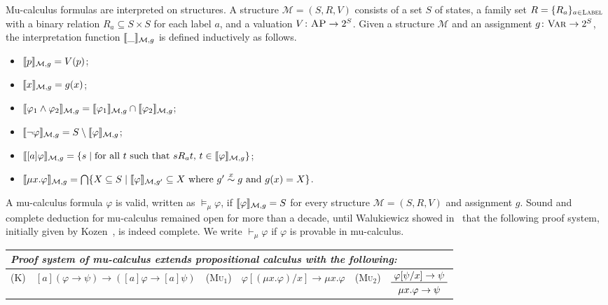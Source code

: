 \documentclass[letter,12pt]{article}
\newcommand{\imp}{\to}
\newcommand{\Var}{\textnormal{\textsc{Var}}}
\newcommand{\MM}{\mathcal{M}}
\newcommand{\pset}[1]{2^{#1}}
\newcommand{\simon}[1]{\overset{#1}{\sim}}
\newcommand{\simx}{\simon{x}}
\newcommand{\prule}[1]{\textsc{(#1)}}
\newcommand{\AP}{\textsc{AP}}
\newcommand{\Label}{\textsc{Label}}
\DeclarePairedDelimiter{\bracket}{\llbracket}{\rrbracket}
\begin{document}
Mu-calculus formulas are interpreted on structures.
A structure $\MM = (S, R, V)$ consists of
a set $S$ of states,
a family set $R = \{R_a\}_{a \in \Label}$ with a binary relation $R_a \subseteq S \times S$
for each label $a$,
and a valuation $V \colon \AP \to \pset{S}$.
Given a structure $\MM$ and an assignment $g \colon \Var \to \pset{S}$,
the interpretation function
$\bracket{\_}_{\MM,g}$ is defined inductively as follows.
\begin{itemize}
\item $\bracket{p}_{\MM,g} = V(p)$;
\item $\bracket{x}_{\MM,g} = g(x)$;
\item $\bracket{\varphi_1 \wedge \varphi_2}_{\MM,g} =
       \bracket{\varphi_1}_{\MM,g} \cap
       \bracket{\varphi_2}_{\MM,g}$;
\item $\bracket{\neg \varphi}_{\MM,g} =
       S \setminus \bracket{\varphi}_{\MM,g}$;    
\item $\bracket{[a]\varphi}_{\MM,g} =
       \{ s \mid \text{for all $t$ such that $s R_a t$, 
       	  $t \in \bracket{\varphi}_{\MM,g}$} \}$;
\item $\bracket{\mu x . \varphi}_{\MM,g} =
       \bigcap \{ X \subseteq S \mid \bracket{\varphi}_{\MM,g'} \subseteq X
       \text{ where $g' \simx g$ and $g(x) = X$} \}$.
\end{itemize}
A mu-calculus formula $\varphi$ is valid, written as $\vDash_\mu \varphi$,
if $\bracket{\varphi}_{\MM,g} = S$ for every structure $\MM = (S,R,V)$ and assignment $g$.
Sound and complete deduction for mu-calculus remained open for more than a decade,
until Walukiewicz showed in~\cite{bibid} that
the following proof system, initially given by Kozen~\cite{bibid}, 
is indeed complete.
We write $\vdash_\mu \varphi$ if $\varphi$ is provable in mu-calculus.
\begin{center}
\begin{tabular}{lllllm{2cm}}
	\multicolumn{6}{l}{\em Proof system of mu-calculus extends
		propositional calculus with the following:}
	\\\hline
	\prule{K}&
	$[a](\varphi \imp \psi) \imp
	([a]\varphi \imp [a]\psi)$
	&
	\prule{Mu$_1$}&
	$\varphi[(\mu x . \varphi) / x] \imp \mu x . \varphi$
	&
	\prule{Mu$_2$}&
	$\prftree{\varphi[\psi / x] \imp \psi}{\mu x . \varphi \imp \psi}$
\end{tabular}
\end{center}
\end{document}
